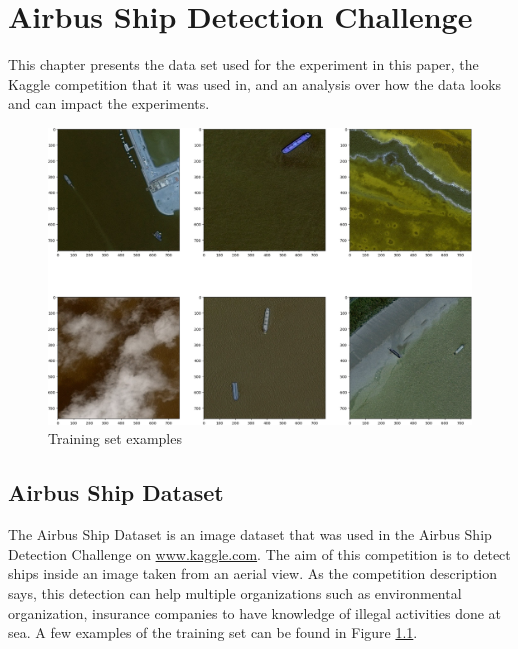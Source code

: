 \chapter{Airbus Ship Detection Challenge}
\label{DatasetChapter}

This chapter presents the data set used for the experiment in this paper, the Kaggle competition that it was used in, and an analysis over how the data looks and can impact the experiments.

\begin{figure}[H]
	\includegraphics[width=\textwidth]{Pictures/003TrainingSetExamples.png}
	\caption{Training set examples}
	\label{TrainSetExample}
\end{figure}

\section{Airbus Ship Dataset}
The Airbus Ship Dataset is an image dataset that was used in the Airbus Ship Detection Challenge \cite{AirbusDataSetChallenge} on \url{www.kaggle.com}. The aim of this competition is to detect ships inside an image taken from an aerial view. As the competition description says, this detection can help multiple organizations such as environmental organization, insurance companies to have knowledge of illegal activities done at sea. A few examples of the training set can be found in Figure \ref{TrainSetExample}.%


